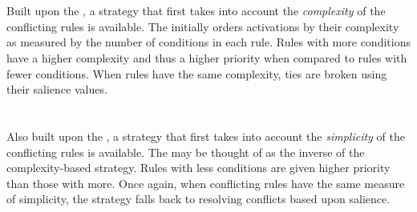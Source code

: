 \section{}

Built upon the , a
strategy that first takes into account the \emph{complexity} of
the conflicting rules is available.  The
 initially orders 
activations by their complexity as measured by the number of
conditions in each rule.  Rules with more conditions have a higher
complexity and thus a higher priority when compared to rules with
fewer conditions.  When rules have the same complexity, ties are
broken using their salience values.  

\section{}

Also built upon the ,
a strategy that first takes into account the \emph{simplicity} of the
conflicting rules is available.  The
 may be thought of as
the inverse of the complexity-based strategy.  Rules with less 
conditions are given higher priority than those with more.  Once
again, when conflicting rules have the same measure of simplicity, 
the strategy falls back to resolving conflicts based upon salience.
